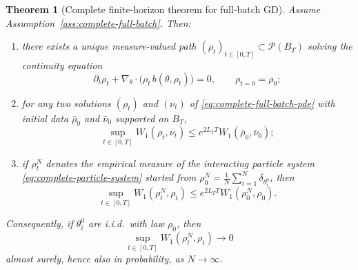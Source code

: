 \documentclass[11pt]{article}
\newtheorem{theorem}{Theorem}
\theoremstyle{definition}
\begin{document}
\begin{theorem}[Complete finite-horizon theorem for full-batch GD]
\label{thm:complete-full-batch}
Assume Assumption~\ref{ass:complete-full-batch}. Then:
\begin{enumerate}[label=(\roman*)]
  \item there exists a unique measure-valued path
  $(\rho_t)_{t\in[0,T]}\subset \mathcal P(B_T)$ solving the continuity equation
  \begin{equation}
    \partial_t \rho_t + \nabla_\theta\cdot\big(\rho_t\,b(\theta,\rho_t)\big)=0,
    \qquad
    \rho_{t=0}=\rho_0;
    \label{eq:complete-full-batch-pde}
  \end{equation}
  \item for any two solutions $(\rho_t)$ and $(\nu_t)$ of
  \eqref{eq:complete-full-batch-pde} with initial data $\bar\rho_0$ and $\bar\nu_0$
  supported on $B_T$,
  \begin{equation}
    \sup_{t\in[0,T]} W_1(\rho_t,\nu_t)
    \le
    e^{2L_T T} W_1(\bar\rho_0,\bar\nu_0);
    \label{eq:complete-pde-stability}
  \end{equation}
  \item if $\rho_t^N$ denotes the empirical measure of the interacting particle
  system \eqref{eq:complete-particle-system} started from
  $\rho_0^N=\frac1N\sum_{i=1}^N\delta_{\theta_i^0}$, then
  \begin{equation}
    \sup_{t\in[0,T]}W_1(\rho_t^N,\rho_t)
    \le
    e^{2L_T T}W_1(\rho_0^N,\rho_0).
    \label{eq:complete-particle-tracking}
  \end{equation}
\end{enumerate}
Consequently, if $\theta_i^0$ are i.i.d.\ with law $\rho_0$, then
\[
  \sup_{t\in[0,T]}W_1(\rho_t^N,\rho_t)\to 0
\]
almost surely, hence also in probability, as $N\to\infty$.
\end{theorem}
\end{document}
